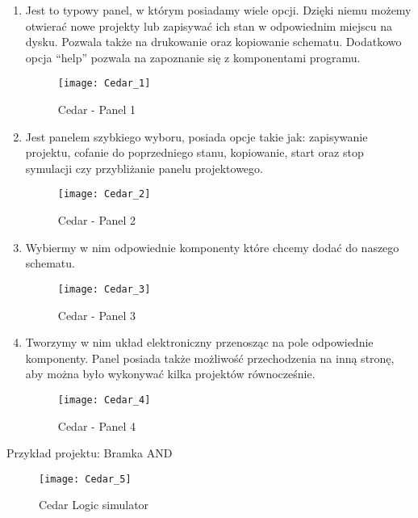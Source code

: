 \documentclass[12pt, a4paper, onside, polish]{article}				%
\begin{document}
 \begin{enumerate}
\item  Jest to typowy panel, w którym posiadamy wiele opcji. Dzięki niemu możemy otwierać nowe projekty lub zapisywać ich stan w odpowiednim miejscu na dysku. Pozwala także na drukowanie oraz kopiowanie schematu. Dodatkowo opcja “help” pozwala na zapoznanie się z komponentami programu. 
  	\begin{figure}[hbt!]
  	  {\centering \texttt{[image: Cedar\_1]} \caption{Cedar - Panel 1}}\vspace{5mm}
  	  \end{figure}
  	  
\item  Jest panelem szybkiego wyboru, posiada opcje takie jak: zapisywanie projektu, cofanie do poprzedniego stanu, kopiowanie, start oraz stop symulacji czy przybliżanie panelu projektowego.
  	\begin{figure}[hbt!]
  	  {\centering \texttt{[image: Cedar\_2]} \caption{Cedar - Panel 2}}\vspace{5mm}
  	  \end{figure}
  	  
  	  \item  Wybiermy w nim odpowiednie komponenty które chcemy dodać do naszego schematu. \newline\newline\newline\newline \newline
  	\begin{figure}[hbt!]
  	  {\centering \texttt{[image: Cedar\_3]} \caption{Cedar - Panel 3}}\vspace{5mm}
  	  \end{figure}
  	  
  	  
  	  \item  Tworzymy w nim układ elektroniczny przenosząc na pole odpowiednie komponenty. Panel posiada także możliwość przechodzenia na inną stronę, aby można było wykonywać kilka projektów równocześnie. 
  	\begin{figure}[hbt!]
  	  {\centering \texttt{[image: Cedar\_4]} \caption{Cedar - Panel 4}}\vspace{5mm}
  	  \end{figure}
\end{enumerate}
\vspace{19mm}
Przykład projektu: Bramka AND
\begin{figure}[hbt!]
{\centering \texttt{[image: Cedar\_5]} \caption{Cedar Logic simulator}}\vspace{5mm}
\end{figure}
\end{document}
